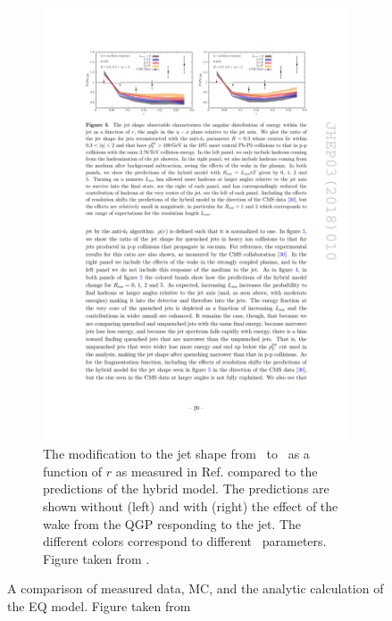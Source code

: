 \begin{figure}
\begin{subfigure}{1\textwidth}
\includegraphics[width=1\textwidth]{figures/jetMeasurements/HM_jetShape}
\caption{The modification to the jet shape from \pp\ to \pbpb\ as a function of $r$ as measured in Ref. \cite{Chatrchyan:2013kwa} compared to the predictions of the hybrid model. The predictions are shown without (left) and with (right) the effect of the wake from the QGP responding to the jet. The different colors correspond to different \Lres\ parameters. Figure taken from \cite{Hulcher:2017cpt}. }
\label{fig:hm_jetshape}
\end{subfigure}
\caption{A comparison of measured data, MC, and the analytic calculation of the EQ model. Figure taken from \cite{Spousta:2015fca}}
\label{fig:HM_modification}
\end{figure}


